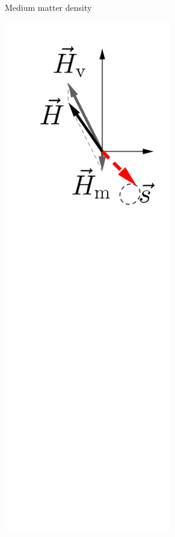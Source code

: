 \begin{figure}[htbp]
\begin{subfigure}[t]{0.3\textwidth}
		\caption{Medium matter density}\label{chap:basics-sec:flavor-isospin-pic-fig:msw-adiabatic-medium-density}
	\end{subfigure}
	\quad
	\begin{subfigure}[t]{0.3\textwidth}
		\centering
		\includegraphics[width=0.8\textwidth]{chapters/assets/basics/matter-effect-adiabatic-small-density}

\end{subfigure}
\end{figure}
